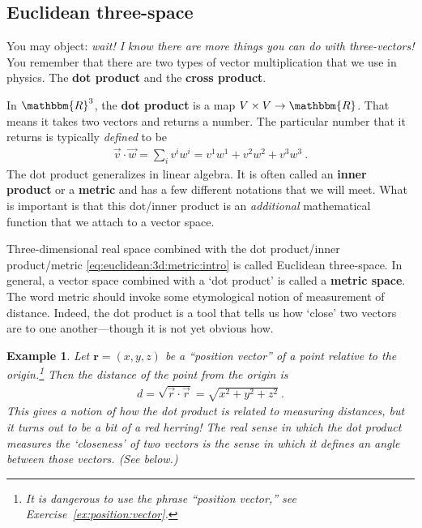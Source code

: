 \documentclass[12pt]{article}
\newtheorem{example}{Example}[section]
\begin{document}
\subsection{Euclidean three-space}

You may object: \emph{wait! I know there are more things you can do with three-vectors!} You remember that there are two types of vector multiplication that we use in physics. The \textbf{dot product} and the \textbf{cross product}. 

In $\mathbbm{R}^3$, the \textbf{dot product} is a map $V\times V \to \mathbbm{R}$. That means it takes two vectors and returns a number. The particular number that it returns is typically \emph{defined} to be
\begin{align}
    \vec{v} \cdot \vec{w} 
    = \sum_i v^i w^i  
    = v^1w^1 + v^2 w^2 + v^3w^3 \ .
    \label{eq:euclidean:3d:metric:intro}
\end{align}
The dot product generalizes in linear algebra. It is often called an \textbf{inner product} or a \textbf{metric} and has a few different notations that we will meet. What is important is that this dot/inner product is an \emph{additional} mathematical function that we attach to a vector space. 

Three-dimensional real space combined with the dot product/inner product/metric \eqref{eq:euclidean:3d:metric:intro} is called Euclidean three-space. In general, a vector space combined with a `dot product' is called a \textbf{metric space}. The word metric should invoke some etymological notion of measurement of distance. Indeed, the dot product is a tool that tells us how `close' two vectors are to one another---though it is not yet obvious how.

\begin{example}
Let $\mathbf{r}=(x,y,z)$ be a ``position vector'' of a point relative to the origin.\footnote{It is dangerous to use the phrase ``position vector,'' see Exercise~\ref{ex:position:vector}.} Then the distance of the point from the origin is
\begin{align}
    d = \sqrt{\vec{r}\cdot\vec{r}} =
    \sqrt{x^2+y^2 +z^2} \ .
    \label{eq:distance:in:space}
\end{align}
This gives a notion of how the dot product is related to measuring distances, but it turns out to be a bit of a red herring! The real sense in which the dot product measures the `closeness' of two vectors is the sense in which it defines an angle between those vectors. (See below.)
\end{example}
\end{document}
